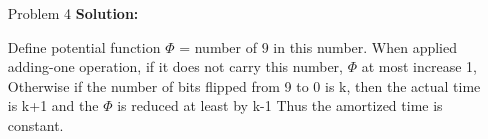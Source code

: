\normalfont\documentclass[letterpaper,11pt]{article}
\begin{document}
\begin{enumerate}
\item [Problem 4]\textbf{Solution:}\par
Define potential function $\Phi$ = number of $9$ in this number. When applied adding-one operation, if it does not carry this number, $\Phi$ at most increase 1, Otherwise if the number of bits flipped from 9 to 0 is k, then the actual time is k+1 and the $\Phi$ is reduced at least by k-1 Thus the amortized time is constant.
\end{enumerate}
\end{document}
